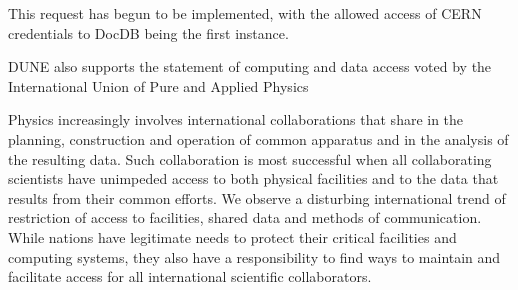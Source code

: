 \documentclass[../main-v1.tex]{subfiles}
\begin{document}
This request has begun to be implemented, with the allowed access of CERN credentials to DocDB being the first instance.

DUNE also supports the statement of computing and data access voted by the International Union of Pure and Applied Physics

Physics increasingly involves international collaborations that share in the planning, construction and operation of common apparatus and in the analysis of the resulting data. Such collaboration is most successful when all collaborating scientists have unimpeded access to both physical facilities and to the data that results from their common efforts.  We observe a disturbing international trend of restriction of access to facilities,  shared data and methods of communication.  While nations have legitimate needs to protect their critical facilities  and computing systems, they also have a responsibility to find ways to maintain and facilitate access for all international scientific collaborators.
\end{document}
